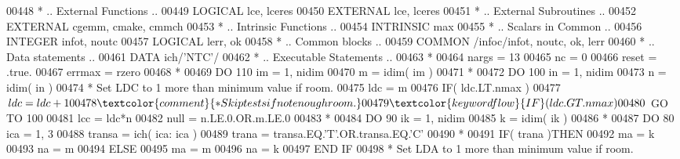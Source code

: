 \begin{DoxyCode}
00448 \textcolor{comment}{*     .. External Functions ..}
00449       \textcolor{keywordtype}{LOGICAL}            lce, lceres
00450       \textcolor{keywordtype}{EXTERNAL}           lce, lceres
00451 \textcolor{comment}{*     .. External Subroutines ..}
00452       \textcolor{keywordtype}{EXTERNAL}           cgemm, cmake, cmmch
00453 \textcolor{comment}{*     .. Intrinsic Functions ..}
00454       \textcolor{keywordtype}{INTRINSIC}          max
00455 \textcolor{comment}{*     .. Scalars in Common ..}
00456       \textcolor{keywordtype}{INTEGER}            infot, noutc
00457       \textcolor{keywordtype}{LOGICAL}            lerr, ok
00458 \textcolor{comment}{*     .. Common blocks ..}
00459       \textcolor{keyword}{COMMON}             /infoc/infot, noutc, ok, lerr
00460 \textcolor{comment}{*     .. Data statements ..}
00461       \textcolor{keyword}{DATA}               ich/\textcolor{stringliteral}{'NTC'}/
00462 \textcolor{comment}{*     .. Executable Statements ..}
00463 \textcolor{comment}{*}
00464       nargs = 13
00465       nc = 0
00466       reset = .true.
00467       errmax = rzero
00468 \textcolor{comment}{*}
00469       \textcolor{keywordflow}{DO} 110 im = 1, nidim
00470          m = idim( im )
00471 \textcolor{comment}{*}
00472          \textcolor{keywordflow}{DO} 100 in = 1, nidim
00473             n = idim( in )
00474 \textcolor{comment}{*           Set LDC to 1 more than minimum value if room.}
00475             ldc = m
00476             \textcolor{keywordflow}{IF}( ldc.LT.nmax )
00477      $         ldc = ldc + 1
00478 \textcolor{comment}{*           Skip tests if not enough room.}
00479             \textcolor{keywordflow}{IF}( ldc.GT.nmax )
00480      $         \textcolor{keywordflow}{GO TO} 100
00481             lcc = ldc*n
00482             null = n.LE.0.OR.m.LE.0
00483 \textcolor{comment}{*}
00484             \textcolor{keywordflow}{DO} 90 ik = 1, nidim
00485                k = idim( ik )
00486 \textcolor{comment}{*}
00487                \textcolor{keywordflow}{DO} 80 ica = 1, 3
00488                   transa = ich( ica: ica )
00489                   trana = transa.EQ.\textcolor{stringliteral}{'T'}.OR.transa.EQ.\textcolor{stringliteral}{'C'}
00490 \textcolor{comment}{*}
00491                   \textcolor{keywordflow}{IF}( trana )\textcolor{keywordflow}{THEN}
00492                      ma = k
00493                      na = m
00494                   \textcolor{keywordflow}{ELSE}
00495                      ma = m
00496                      na = k
00497 \textcolor{keywordflow}{                  END IF}
00498 \textcolor{comment}{*                 Set LDA to 1 more than minimum value if room.}

\end{DoxyCode}
